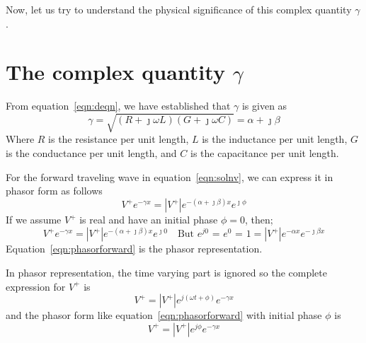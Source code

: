 Now, let us try to understand the physical significance of this complex quantity $\gamma$.

\section{The complex quantity $\gamma$}\label{lec:lec3}
From equation~\eqref{eqn:deqn}, we have established that $\gamma$ is given as
\begin{dmath}
\gamma = \sqrt{(R + \jmath\omega L)(G + \jmath\omega C)}
= \alpha + \jmath\beta
\label{eqn:gamma}
\end{dmath}
Where $R$ is the resistance per unit length, $L$ is the inductance per unit length, $G$ is the conductance per unit length, and $C$ is the capacitance per unit length.

For the forward traveling wave in equation~\eqref{eqn:solnv}, we can express it in phasor form as follows
\begin{equation}
V^+e^{-\gamma x} =\left|V^+\right|e^{-(\alpha + \jmath\beta)x}e^{\jmath\phi}
\end{equation}
If we assume $V^+$ is real and have an initial phase $\phi = 0$, then;
\begin{dmath}
V^+e^{-\gamma x} = \left| V^+\right| e^{-(\alpha + \jmath\beta)x}e^{\jmath0}\quad\text{But }e^{j0}\text{ = }e^0\text{ = }1
= \left| V^+\right| e^{-\alpha x}e^{-\jmath\beta x}
\label{eqn:phasorforward}
\end{dmath}
Equation~\eqref{eqn:phasorforward} is the phasor representation.

In phasor representation, the time varying part is ignored so the complete expression for $V^+$ is 
\begin{equation*}
V^+ = \left|V^+\right|e^{j(\omega t + \phi)} e^{-\gamma x} 
\end{equation*}
and the phasor form like equation~\eqref{eqn:phasorforward} with initial phase $\phi$ is
\begin{equation*}
V^+ = \left|V^+\right|e^{j\phi} e^{-\gamma x}
\end{equation*}

